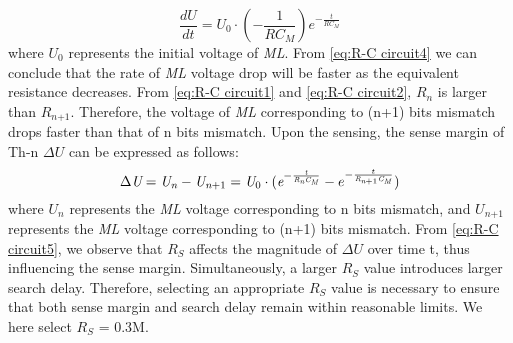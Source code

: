 \begin{equation}
\label{eq:R-C circuit4}
      \frac{\textit{dU}}{\textit{dt}}=\textit{U}_\text{0}\cdot (-\frac{\text{1}}{\textit{RC}_\textit{M}})\textit{e}^{-\frac{\textit{t}}{\textit{RC}_\textit{M}}}
\end{equation}
where $\textit{U}_\text{0}$ represents the initial voltage of \textit{ML}. 
From \autoref{eq:R-C circuit4} we can conclude that the rate of \textit{ML} voltage drop will be faster as the equivalent resistance decreases. 
From \autoref{eq:R-C circuit1} and \autoref{eq:R-C circuit2}, $\textit{R}_\textit{n}$ is larger than $\textit{R}_{\textit{n}\text{+1}}$. 
Therefore,  the voltage of \textit{ML} corresponding to (n+1) bits mismatch drops faster than that of n bits mismatch.
Upon the sensing, the sense margin of Th-n $\Delta U$ can be expressed as follows:
\begin{equation}
\label{eq:R-C circuit5}
     \Delta \textit{U}=\textit{U}_\textit{n}-\textit{U}_{\textit{n}\text{+1}}=\textit{U}_\text{0}\cdot (\textit{e}^{-\frac{\textit{t}}{\textit{R}_\textit{n}\textit{C}_\textit{M}}}-e^{-\frac{t}{\textit{R}_{\textit{n}\text{+1}}\textit{C}_\textit{M}}}) 
\vspace{0.1cm}
\end{equation}
where $\textit{U}_\textit{n}$ represents the \textit{ML} voltage corresponding to  n bits mismatch, and $\textit{U}_{\textit{n}\text{+1}}$ represents the \textit{ML} voltage corresponding to (n+1) bits mismatch.
From \autoref{eq:R-C circuit5}, we observe that $\textit{R}_\textit{S}$ affects the magnitude of $\Delta$$U$ over time t, thus influencing the sense margin. Simultaneously, a larger $\textit{R}_\textit{S}$ value introduces larger search delay. Therefore, selecting an appropriate $\textit{R}_\textit{S}$ value is necessary to ensure that both sense margin and search delay remain within reasonable limits. 
We here select $\textit{R}_\textit{S}$ = 0.3M.%




